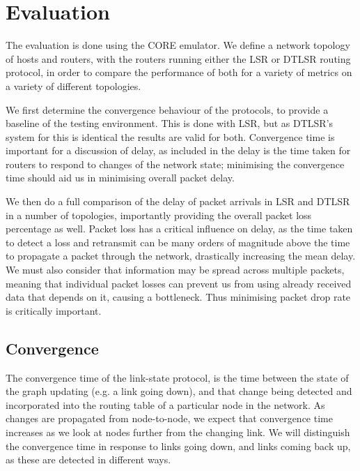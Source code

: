 \documentclass[withindex,glossary,openany]{cam-thesis}
\begin{document}
\chapter{Evaluation}

The evaluation is done using the CORE emulator. We define a network topology of hosts and routers, with the routers running either the LSR or DTLSR routing protocol, in order to compare the performance of both for a variety of metrics on a variety of different topologies.

We first determine the convergence behaviour of the protocols, to provide a baseline of the testing environment. This is done with LSR, but as DTLSR's system for this is identical the results are valid for both. Convergence time is important for a discussion of delay, as included in the delay is the time taken for routers to respond to changes of the network state; minimising the convergence time should aid us in minimising overall packet delay.

We then do a full comparison of the delay of packet arrivals in LSR and DTLSR in a number of topologies, importantly providing the overall packet loss percentage as well. Packet loss has a critical influence on delay, as the time taken to detect a loss and retransmit can be many orders of magnitude above the time to propagate a packet through the network, drastically increasing the mean delay. We must also consider that information may be spread across multiple packets, meaning that individual packet losses can prevent us from using already received data that depends on it, causing a bottleneck. Thus minimising packet drop rate is critically important.

\section{Convergence}

The convergence time of the link-state protocol, is the time between the state of the graph updating (e.g. a link going down), and that change being detected and incorporated into the routing table of a particular node in the network. As changes are propagated from node-to-node, we expect that convergence time increases as we look at nodes further from the changing link. We will distinguish the convergence time in response to links going down, and links coming back up, as these are detected in different ways. 
\end{document}
